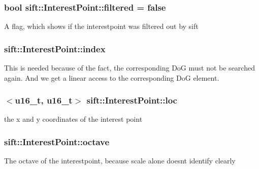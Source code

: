 \subsubsection[{filtered}]{\setlength{\rightskip}{0pt plus 5cm}bool sift\+::\+Interest\+Point\+::filtered = false}\label{classsift_1_1InterestPoint_a613fd840fa925b4885d5228fd2c1290c}
A flag, which shows if the interestpoint was filtered out by sift \hypertarget{classsift_1_1InterestPoint_a9ec87bddea9e66a5e7e655ddf6483799}{}
\subsubsection[{index}]{ sift\+::\+Interest\+Point\+::index}\label{classsift_1_1InterestPoint_a9ec87bddea9e66a5e7e655ddf6483799}
This is needed because of the fact, the corresponding Do\+G must not be searched again. And we get a linear access to the corresponding Do\+G element. \hypertarget{classsift_1_1InterestPoint_a843e9ca44ce7ddefead792ca4c787f20}{}
\subsubsection[{loc}]{$<${\bf u16\+\_\+t}, {\bf u16\+\_\+t}$>$ sift\+::\+Interest\+Point\+::loc}\label{classsift_1_1InterestPoint_a843e9ca44ce7ddefead792ca4c787f20}
the x and y coordinates of the interest point \hypertarget{classsift_1_1InterestPoint_a2daaf1185f5658cabc2e8a3768b7f321}{}
\subsubsection[{octave}]{ sift\+::\+Interest\+Point\+::octave}\label{classsift_1_1InterestPoint_a2daaf1185f5658cabc2e8a3768b7f321}
The octave of the interestpoint, because scale alone doesn\textquotesingle{}t identify clearly \hypertarget{classsift_1_1InterestPoint_adbf265440c475aad71f31d8e81306a8b}{}
